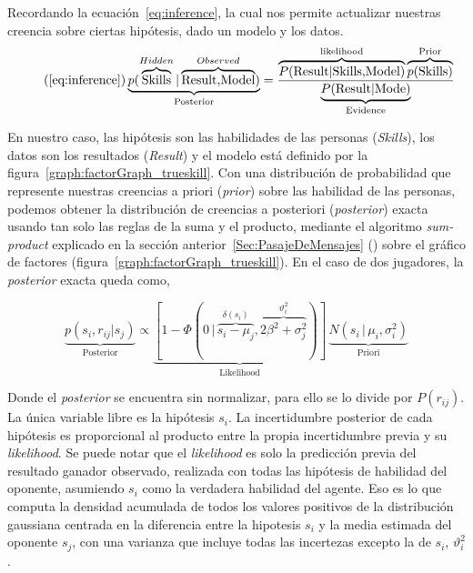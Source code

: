\documentclass[11pt,twoside,spanish]{report} %
\begin{document}
Recordando la ecuaci\'on~\ref{eq:inference}, la cual nos permite actualizar nuestras creencia sobre ciertas hip\'otesis, dado un modelo y los datos.
\begin{equation}\tag{\ref{eq:inference}}
\underbrace{p(\overbrace{\text{Skills}}^{Hidden}|\overbrace{\text{Result,Model}}^{Observed})}_{\text{Posterior}} = \frac{\overbrace{P(\text{Result}|\text{Skills,Model})}^{\text{likelihood}}\overbrace{p(\text{Skills})}^{\text{Prior}}}{\underbrace{P(\text{Result}|\text{Mode})}_{\text{Evidence}}}
\end{equation}

En nuestro caso, las hip\'otesis son las habilidades de las personas (\textit{Skills}), los datos son los resultados (\textit{Result}) y el modelo est\'a definido por la figura~\ref{graph:factorGraph_trueskill}.
Con una distribuci\'on de probabilidad que represente nuestras creencias a priori (\textit{prior}) sobre las habilidad de las personas, podemos obtener la distribuci\'on de creencias a posteriori (\textit{posterior}) exacta usando tan solo las reglas de la suma y el producto, mediante el algoritmo \textit{sum-product} explicado en la secci\'on anterior~\ref{Sec:PasajeDeMensajes} ()  sobre el gr\'afico de factores (figura~\ref{graph:factorGraph_trueskill}).
En el caso de dos jugadores, la \textit{posterior} exacta queda como,

\begin{equation}\label{eq:bayesaprox}
\underbrace{p(s_i, r_{ij}| s_j)}_{\text{Posterior}} \propto
 \underbrace{[1 - \Phi(0 \, | \, \overbrace{s_i - \mu_j}^{\delta(s_i)},  \overbrace{ 2\beta^2 + \sigma_j^2}^{\vartheta_i^2})]}_{\text{Likelihood}} \,  \underbrace{N(s_i \, | \, \mu_i, \sigma_i^2 )}_{\text{Priori}}
\end{equation}



Donde el \textit{posterior} se encuentra sin normalizar, para ello se lo divide por $P(r_{ij})$.
La \'unica variable libre es la hip\'otesis $s_i$.
La incertidumbre posterior de cada hip\'otesis es proporcional al producto entre la propia incertidumbre previa y su \textit{likelihood}.
Se puede notar que el \textit{likelihood} es solo la predicci\'on previa del resultado ganador observado, realizada con todas las hip\'otesis de habilidad del oponente, asumiendo $s_i$ como la verdadera habilidad del agente.
Eso es lo que computa la densidad acumulada de todos los valores positivos de la distribuci\'on gaussiana centrada en la diferencia entre la hipotesis $s_i$ y la media estimada del oponente $s_j$, con una varianza que incluye todas las incertezas excepto la de $s_i$, $\vartheta_i^2$.
\end{document}

